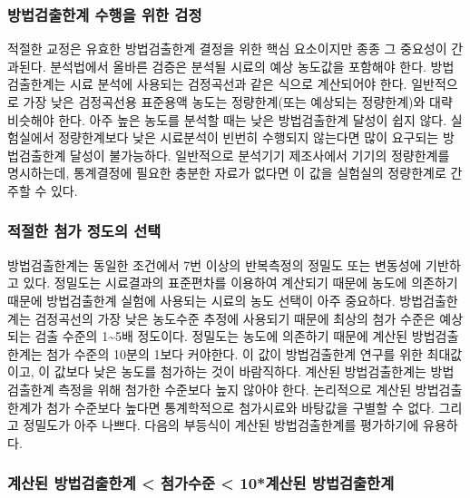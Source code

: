 \documentclass[
]{book}
\begin{document}
\hypertarget{uxbc29uxbc95uxac80uxcd9cuxd55cuxacc4-uxc218uxd589uxc744-uxc704uxd55c-uxac80uxc815}{%
\subsubsection{방법검출한계 수행을 위한 검정}\label{uxbc29uxbc95uxac80uxcd9cuxd55cuxacc4-uxc218uxd589uxc744-uxc704uxd55c-uxac80uxc815}}

적절한 교정은 유효한 방법검출한계 결정을 위한 핵심 요소이지만 종종 그 중요성이 간과된다. 분석법에서 올바른 검증은 분석될 시료의 예상 농도값을 포함해야 한다. 방법검출한계는 시료 분석에 사용되는 검정곡선과 같은 식으로 계산되어야 한다. 일반적으로 가장 낮은 검정곡선용 표준용액 농도는 정량한계(또는 예상되는 정량한계)와 대략 비슷해야 한다. 아주 높은 농도를 분석할 때는 낮은 방법검출한계 달성이 쉽지 않다. 실험실에서 정량한계보다 낮은 시료분석이 빈번히 수행되지 않는다면 많이 요구되는 방법검출한계 달성이 불가능하다. 일반적으로 분석기기 제조사에서 기기의 정량한계를 명시하는데, 통계결정에 필요한 충분한 자료가 없다면 이 값을 실험실의 정량한계로 간주할 수 있다.

\hypertarget{uxc801uxc808uxd55c-uxcca8uxac00-uxc815uxb3c4uxc758-uxc120uxd0dd}{%
\subsubsection{적절한 첨가 정도의 선택}\label{uxc801uxc808uxd55c-uxcca8uxac00-uxc815uxb3c4uxc758-uxc120uxd0dd}}

방법검출한계는 동일한 조건에서 7번 이상의 반복측정의 정밀도 또는 변동성에 기반하고 있다. 정밀도는 시료결과의 표준편차를 이용하여 계산되기 때문에 농도에 의존하기 때문에 방법검출한계 실험에 사용되는 시료의 농도 선택이 아주 중요하다. 방법검출한계는 검정곡선의 가장 낮은 농도수준 추정에 사용되기 때문에 최상의 첨가 수준은 예상되는 검출 수준의 1\textasciitilde5배 정도이다. 정밀도는 농도에 의존하기 때문에 계산된 방법검출한계는 첨가 수준의 10분의 1보다 커야한다. 이 값이 방법검출한계 연구를 위한 최대값이고, 이 값보다 낮은 농도를 첨가하는 것이 바람직하다. 계산된 방법검출한계는 방법검출한계 측정을 위해 첨가한 수준보다 높지 않아야 한다. 논리적으로 계산된 방법검출한계가 첨가 수준보다 높다면 통계학적으로 첨가시료와 바탕값을 구별할 수 없다. 그리고 정밀도가 아주 나쁘다. 다음의 부등식이 계산된 방법검출한계를 평가하기에 유용하다.

\hypertarget{uxacc4uxc0b0uxb41c-uxbc29uxbc95uxac80uxcd9cuxd55cuxacc4-uxcca8uxac00uxc218uxc900-10uxacc4uxc0b0uxb41c-uxbc29uxbc95uxac80uxcd9cuxd55cuxacc4}{%
\subsubsection{계산된 방법검출한계 \textless{} 첨가수준 \textless{} 10*계산된 방법검출한계}\label{uxacc4uxc0b0uxb41c-uxbc29uxbc95uxac80uxcd9cuxd55cuxacc4-uxcca8uxac00uxc218uxc900-10uxacc4uxc0b0uxb41c-uxbc29uxbc95uxac80uxcd9cuxd55cuxacc4}}
\end{document}
